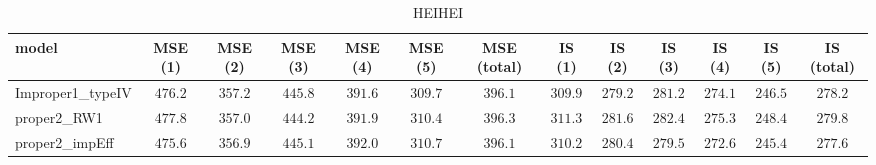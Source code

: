 \begin{table}

\caption{\label{tab:model choice Extremadura}HEIHEI}
\centering
\begin{tabular}{lcccccccccccc}
\hline
model  & MSE (1) & MSE (2) & MSE (3) & MSE (4) & MSE (5) & MSE (total) & IS (1) & IS (2) & IS (3) & IS (4) & IS (5) & \multicolumn{1}{c}{IS (total)} \\ 
\hline
Improper1_typeIV  & $476.2$ & $357.2$ & $445.8$ & $391.6$ & $309.7$ & $396.1$ & $309.9$ & $279.2$ & $281.2$ & $274.1$ & $246.5$ & $278.2$ \\
proper2_RW1  & $477.8$ & $357.0$ & $444.2$ & $391.9$ & $310.4$ & $396.3$ & $311.3$ & $281.6$ & $282.4$ & $275.3$ & $248.4$ & $279.8$ \\
proper2_impEff  & $475.6$ & $356.9$ & $445.1$ & $392.0$ & $310.7$ & $396.1$ & $310.2$ & $280.4$ & $279.5$ & $272.6$ & $245.4$ & $277.6$ \\
\hline 
\end{tabular}

\end{table}